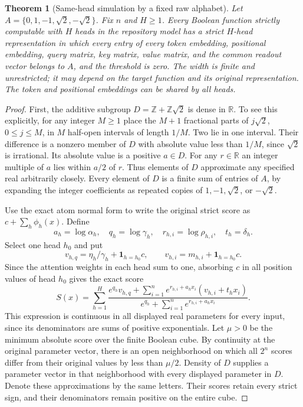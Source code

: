 \documentclass[11pt]{article}
\newtheorem{theorem}{Theorem}
\begin{document}
\begin{theorem}[Same-head simulation by a fixed raw alphabet]
Let $A=\{0,1,-1,\sqrt2,-\sqrt2\}$. Fix $n$ and $H\ge1$.
Every Boolean function strictly computable with $H$ heads in the
repository model has a strict $H$-head representation in which every
entry of every token embedding, positional embedding, query matrix,
key matrix, value matrix, and the common readout vector belongs to
$A$, and the threshold is zero. The width is finite and unrestricted;
it may depend on the target function and its original representation.
The token and positional embeddings can be shared by all heads.
\end{theorem}
\begin{proof}
First, the additive subgroup $D=\mathbb Z+\mathbb Z\sqrt2$ is dense
in $\mathbb R$. To see this explicitly, for any integer $M\ge1$
place the $M+1$ fractional parts of $j\sqrt2$, $0\le j\le M$,
in $M$ half-open intervals of length $1/M$. Two lie in one interval.
Their difference is a nonzero member of $D$ with absolute value less
than $1/M$, since $\sqrt2$ is irrational. Its absolute value is a
positive $a\in D$. For any $r\in\mathbb R$ an integer multiple
of $a$ lies within $a/2$ of $r$. Thus elements of $D$ approximate
any specified real arbitrarily closely. Every element of $D$ is a
finite sum of entries of $A$, by expanding the integer coefficients
as repeated copies of $1,-1,\sqrt2$, or $-\sqrt2$.

Use the exact atom normal form to write the original strict score as
$c+\sum_h\phi_h(x)$. Define
\[
 a_h=\log\alpha_h,\quad q_h=\log\gamma_h,\quad
 r_{h,i}=\log\rho_{h,i},\quad t_h=\delta_h.
\]
Select one head $h_0$ and put
\[
 v_{h,q}=\eta_h/\gamma_h+\mathbf1_{h=h_0}c,
 \qquad v_{h,i}=m_{h,i}+\mathbf1_{h=h_0}c.
\]
Since the attention weights in each head sum to one, absorbing $c$
in all position values of head $h_0$ gives the exact score
\[
 S(x)=\sum_{h=1}^H
 \frac{e^{q_h}v_{h,q}
 +\sum_{i=1}^n e^{r_{h,i}+a_hx_i}(v_{h,i}+t_hx_i)}
 {e^{q_h}+\sum_{i=1}^n e^{r_{h,i}+a_hx_i}}.
\]
This expression is continuous in all displayed real parameters for
every input, since its denominators are sums of positive exponentials.
Let $\mu>0$ be the minimum absolute score over the finite Boolean
cube. By continuity at the original parameter vector, there is an
open neighborhood on which all $2^n$ scores differ from their
original values by less than $\mu/2$. Density of $D$ supplies a
parameter vector in that neighborhood with every displayed parameter
in $D$. Denote these approximations by the same letters. Their
scores retain every strict sign, and their denominators remain
positive on the entire cube.


\end{proof}
\end{document}
